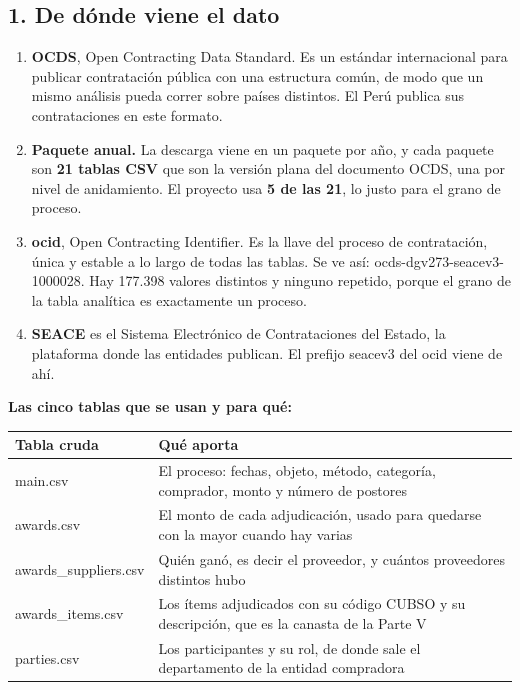 \documentclass[11pt]{article}
\begin{document}
\subsection*{1. De dónde viene el dato}
\begin{enumerate}
  \item \textbf{OCDS}, Open Contracting Data Standard. Es un estándar internacional para publicar contratación pública con una estructura común, de modo que un mismo análisis pueda correr sobre países distintos. El Perú publica sus contrataciones en este formato.
  \item \textbf{Paquete anual.} La descarga viene en un paquete por año, y cada paquete son \textbf{21 tablas CSV} que son la versión plana del documento OCDS, una por nivel de anidamiento. El proyecto usa \textbf{5 de las 21}, lo justo para el grano de proceso.
  \item \textbf{ocid}, Open Contracting Identifier. Es la llave del proceso de contratación, única y estable a lo largo de todas las tablas. Se ve así: ocds-dgv273-seacev3-1000028. Hay 177.398 valores distintos y ninguno repetido, porque el grano de la tabla analítica es exactamente un proceso.
  \item \textbf{SEACE} es el Sistema Electrónico de Contrataciones del Estado, la plataforma donde las entidades publican. El prefijo seacev3 del ocid viene de ahí.
\end{enumerate}
\textbf{Las cinco tablas que se usan y para qué:}

\begin{center}\footnotesize
\begin{tabularx}{\linewidth}{Q{0.360}Q{1.640}}
\toprule
\textbf{Tabla cruda} & \textbf{Qué aporta} \\
\midrule
main.csv & El proceso: fechas, objeto, método, categoría, comprador, monto y número de postores \\
awards.csv & El monto de cada adjudicación, usado para quedarse con la mayor cuando hay varias \\
awards\_\allowbreak{}suppliers.csv & Quién ganó, es decir el proveedor, y cuántos proveedores distintos hubo \\
awards\_\allowbreak{}items.csv & Los ítems adjudicados con su código CUBSO y su descripción, que es la canasta de la Parte V \\
parties.csv & Los participantes y su rol, de donde sale el departamento de la entidad compradora \\
\bottomrule
\end{tabularx}
\end{center}
\end{document}
